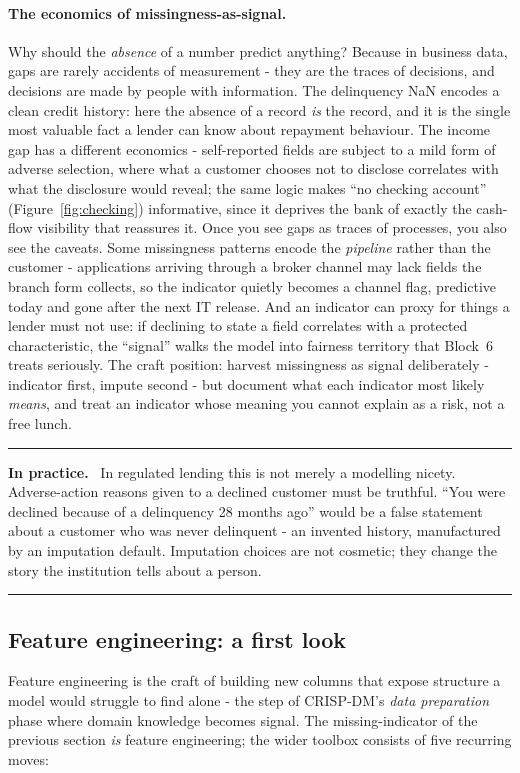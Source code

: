 \documentclass[11pt,a4paper]{article}
\newenvironment{practice}
  {\par\medskip\noindent\begin{minipage}{\linewidth}
   \rule{\linewidth}{0.4pt}\par\smallskip
   \small\textbf{In practice.}\ }
  {\par\smallskip\rule{\linewidth}{0.4pt}\end{minipage}\medskip\par}
\begin{document}
\paragraph{The economics of missingness-as-signal.} Why should the
\emph{absence} of a number predict anything? Because in business data,
gaps are rarely accidents of measurement - they are the traces of
decisions, and decisions are made by people with information. The
delinquency NaN encodes a clean credit history: here the absence of a
record \emph{is} the record, and it is the single most valuable fact a
lender can know about repayment behaviour. The income gap has a different
economics - self-reported fields are subject to a mild form of adverse
selection, where what a customer chooses not to disclose correlates with
what the disclosure would reveal; the same logic makes ``no checking
account'' (Figure~\ref{fig:checking}) informative, since it deprives the
bank of exactly the cash-flow visibility that reassures it. Once you see
gaps as traces of processes, you also see the caveats. Some
missingness patterns encode the \emph{pipeline} rather than the customer
- applications arriving through a broker channel may lack fields the
branch form collects, so the indicator quietly becomes a channel flag,
predictive today and gone after the next IT release. And an indicator can
proxy for things a lender must not use: if declining to state a field
correlates with a protected characteristic, the ``signal'' walks the
model into fairness territory that Block~6 treats seriously. The craft
position: harvest missingness as signal deliberately - indicator first,
impute second - but document what each indicator most likely
\emph{means}, and treat an indicator whose meaning you cannot explain as
a risk, not a free lunch.

\begin{practice}
In regulated lending this is not merely a modelling nicety. Adverse-action
reasons given to a declined customer must be truthful. ``You were declined
because of a delinquency 28 months ago'' would be a false statement about a
customer who was never delinquent - an invented history, manufactured by
an imputation default. Imputation choices are not cosmetic; they change the
story the institution tells about a person.
\end{practice}

\subsection{Feature engineering: a first look}
\label{sec:fe}
Feature engineering is the craft of building new columns that expose
structure a model would struggle to find alone - the step of CRISP-DM's
\emph{data preparation} phase where domain knowledge becomes signal. The
missing-indicator of the previous section \emph{is} feature engineering; the
wider toolbox consists of five recurring moves:
\end{document}
